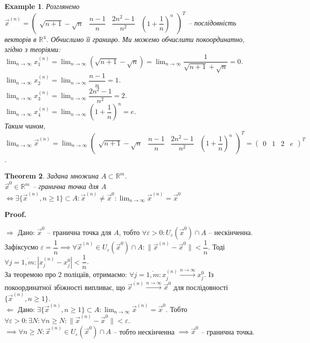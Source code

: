 \documentclass[a4paper, 10pt]{article}
\makeatletter
\def\huge{\displaystyle}
\def\rightproof{$\boxed{\Rightarrow}$ }
\def\leftproof{$\boxed{\Leftarrow}$ }
\theoremstyle{theoremdd}
\newtheorem{theorem}{Theorem}[subsection]
\theoremstyle{theoremdd}
\theoremstyle{theoremdd}
\theoremstyle{theoremdd}
\theoremstyle{theoremdd}
\newtheorem{example}[theorem]{Example}
\theoremstyle{theoremdd}
\theoremstyle{theoremdd}
\theoremstyle{theoremdd}
\theoremstyle{theoremdd}
\renewenvironment{proof}[1][Proof.\\]{\par
\pushQED{\hfill \qed}%
\normalfont \topsep6\p@\@plus6\p@\relax
\trivlist
\item\relax
{\bfseries
#1\@addpunct{.}}\hspace\labelsep\ignorespaces
}{%
\popQED\endtrivlist\@endpefalse
}
\newcommand\Norm[1]{\|#1\|}
\makeatother
\begin{document}
\begin{example}
Розглянемо $\vec{x}^{(n)} = \begin{pmatrix}
\sqrt{n+1}-\sqrt{n} & \dfrac{n-1}{n} & \dfrac{2n^2-1}{n^2} & \left( 1 + \dfrac{1}{n} \right)^n
\end{pmatrix}^T$ -- послідовність векторів в $\mathbb{R}^4$. Обчислимо її границю. Ми можемо обчислити покоординатно, згідно з теоріями:\\
$\huge\lim_{n \to \infty} x_1^{(n)} = \lim_{n \to \infty} (\sqrt{n+1}-\sqrt{n}) = \lim_{n \to \infty} \dfrac{1}{\sqrt{n+1}+\sqrt{n}} = 0$.\\
$\huge\lim_{n \to \infty} x_2^{(n)} = \lim_{n \to \infty} \dfrac{n-1}{n} = 1$.\\
$\huge\lim_{n \to \infty} x_3^{(n)} = \lim_{n \to \infty} \dfrac{2n^2-1}{n^2} = 2$.\\
$\huge\lim_{n \to \infty} x_4^{(n)} = \lim_{n \to \infty} \left( 1 + \dfrac{1}{n}\right)^n = e$.\\
Таким чином, $\huge\lim_{n \to \infty} \vec{x}^{(n)} = \lim_{n \to \infty} \begin{pmatrix}
\sqrt{n+1}-\sqrt{n} & \dfrac{n-1}{n} & \dfrac{2n^2-1}{n^2} & \left( 1 + \dfrac{1}{n} \right)^n
\end{pmatrix}^T = \begin{pmatrix}
0 & 1 & 2 & e
\end{pmatrix}^T$.
\end{example}

\begin{theorem}
Задана множина $A \subset \mathbb{R}^m$.\\
$\vec{x}^0 \in \mathbb{R}^m$ -- гранична точка для $A$ $\iff \exists \{\vec{x}^{(n)}, n \geq 1\} \subset A: \vec{x}^{(n)} \neq \vec{x}^0: \huge \lim_{n \to \infty} \vec{x}^{(n)} = \vec{x}^0$\\
\end{theorem}

\begin{proof}
\rightproof Дано: $\vec{x}^0$ -- гранична точка для $A$, тобто $\forall \varepsilon > 0: U_{\varepsilon}(\vec{x}^0) \cap A$ -- нескінченна.\\
Зафіксуємо $\varepsilon = \dfrac{1}{n} \implies \forall \vec{x}^{(n)} \in U_{\varepsilon}(\vec{x}^0) \cap A: \Norm{\vec{x}^{(n)} - \vec{x}^0} < \dfrac{1}{n}$. Тоді $\forall j = \overline{1,m}: |x_j^{(n)} - x_j^0| < \dfrac{1}{n}$.\\
За теоремою про 2 поліцаїв, отримаємо: $\forall j = \overline{1,m}: x_j^{(n)} \overset{n \to \infty}{\longrightarrow} x_j^0$. Із покоординатної збіжності випливає, що $\vec{x}^{(n)} \overset{n \to \infty}{\longrightarrow} \vec{x}^0$ для послідовності $\{\vec{x}^{(n)}, n \geq 1\}$.
\bigskip \\
\leftproof Дано: $\exists \{\vec{x}^{(n)}, n \geq 1\} \subset A: \huge \lim_{n \to \infty} \vec{x}^{(n)} = \vec{x}^0$. Тобто $\forall \varepsilon > 0: \exists N: \forall n \geq N: \Norm{\vec{x}^{(n)} - \vec{x}^0} < \varepsilon$.\\
$\implies \forall n \geq N: \vec{x}^{(n)} \in U_\varepsilon(\vec{x}^0) \cap A$ -- тобто нескінченна $\implies \vec{x}^{0}$ -- гранична точка.
\end{proof}
\end{document}
